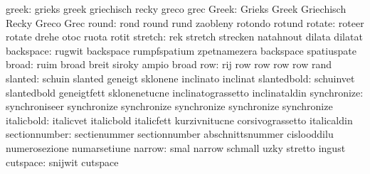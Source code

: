                     greek: grieks                    greek
                           griechisch                recky
                           greco                     grec
                    Greek: Grieks                    Greek
                           Griechisch                Recky
                           Greco                     Grec
                    round: rond                      round
                           rund                      zaobleny
                           rotondo                   rotund
                   rotate: roteer                    rotate
                           drehe                     otoc
                           ruota                     rotit
                  stretch: rek                       stretch
                           strecken                  natahnout
                           dilata                    dilatat
                backspace: rugwit                    backspace
                           rumpfspatium              zpetnamezera
                           backspace                 spatiuspate %
                    broad: ruim                      broad
                           breit                     siroky
                           ampio                     broad
                      row: rij                       row
                           row                       row
                           row                       rand
                  slanted: schuin                    slanted
                           geneigt                   sklonene
                           inclinato                 inclinat
              slantedbold: schuinvet                 slantedbold
                           geneigtfett               sklonenetucne
                           inclinatograssetto        inclinataldin
              synchronize: synchroniseer             synchronize
                           synchronize               synchronize
                           synchronize               synchronize
               italicbold: italicvet                 italicbold
                           italicfett                kurzivnitucne
                           corsivograssetto          italicaldin
            sectionnumber: sectienummer              sectionnumber
                           abschnittsnummer          cislooddilu
                           numerosezione             numarsetiune
                   narrow: smal                      narrow
                           schmall                   uzky
                           stretto                   ingust
                 cutspace: snijwit                   cutspace
